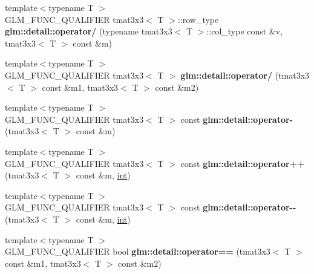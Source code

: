 \begin{DoxyCompactItemize}
\item 
\hypertarget{namespaceglm_1_1detail_a49ba26f5b406e850cadd61cbfb5cbe0b}{}{\footnotesize template$<$typename T $>$ }\\G\+L\+M\+\_\+\+F\+U\+N\+C\+\_\+\+Q\+U\+A\+L\+I\+F\+I\+E\+R tmat3x3$<$ T $>$\+::row\+\_\+type {\bfseries glm\+::detail\+::operator/} (typename tmat3x3$<$ T $>$\+::col\+\_\+type const \&v, tmat3x3$<$ T $>$ const \&m)\label{namespaceglm_1_1detail_a49ba26f5b406e850cadd61cbfb5cbe0b}

\item 
\hypertarget{namespaceglm_1_1detail_ac1649184aad412f56831fc1a8b6bc9de}{}{\footnotesize template$<$typename T $>$ }\\G\+L\+M\+\_\+\+F\+U\+N\+C\+\_\+\+Q\+U\+A\+L\+I\+F\+I\+E\+R tmat3x3$<$ T $>$ {\bfseries glm\+::detail\+::operator/} (tmat3x3$<$ T $>$ const \&m1, tmat3x3$<$ T $>$ const \&m2)\label{namespaceglm_1_1detail_ac1649184aad412f56831fc1a8b6bc9de}

\item 
\hypertarget{namespaceglm_1_1detail_a0ce44ce808f162f9e97a2f275975b611}{}{\footnotesize template$<$typename T $>$ }\\G\+L\+M\+\_\+\+F\+U\+N\+C\+\_\+\+Q\+U\+A\+L\+I\+F\+I\+E\+R tmat3x3$<$ T $>$ const {\bfseries glm\+::detail\+::operator-\/} (tmat3x3$<$ T $>$ const \&m)\label{namespaceglm_1_1detail_a0ce44ce808f162f9e97a2f275975b611}

\item 
\hypertarget{namespaceglm_1_1detail_a48c8755597f13f46339939814ca19e5b}{}{\footnotesize template$<$typename T $>$ }\\G\+L\+M\+\_\+\+F\+U\+N\+C\+\_\+\+Q\+U\+A\+L\+I\+F\+I\+E\+R tmat3x3$<$ T $>$ const {\bfseries glm\+::detail\+::operator++} (tmat3x3$<$ T $>$ const \&m, \hyperlink{_s_d_l__thread_8h_a6a64f9be4433e4de6e2f2f548cf3c08e}{int})\label{namespaceglm_1_1detail_a48c8755597f13f46339939814ca19e5b}

\item 
\hypertarget{namespaceglm_1_1detail_ad1cecbeb2bde6f87f6054c17d554e496}{}{\footnotesize template$<$typename T $>$ }\\G\+L\+M\+\_\+\+F\+U\+N\+C\+\_\+\+Q\+U\+A\+L\+I\+F\+I\+E\+R tmat3x3$<$ T $>$ const {\bfseries glm\+::detail\+::operator-\/-\/} (tmat3x3$<$ T $>$ const \&m, \hyperlink{_s_d_l__thread_8h_a6a64f9be4433e4de6e2f2f548cf3c08e}{int})\label{namespaceglm_1_1detail_ad1cecbeb2bde6f87f6054c17d554e496}

\item 
\hypertarget{namespaceglm_1_1detail_a2690c299d39a5f04d05e4b14f8a4fcfe}{}{\footnotesize template$<$typename T $>$ }\\G\+L\+M\+\_\+\+F\+U\+N\+C\+\_\+\+Q\+U\+A\+L\+I\+F\+I\+E\+R bool {\bfseries glm\+::detail\+::operator==} (tmat3x3$<$ T $>$ const \&m1, tmat3x3$<$ T $>$ const \&m2)\label{namespaceglm_1_1detail_a2690c299d39a5f04d05e4b14f8a4fcfe}


\end{DoxyCompactItemize}
